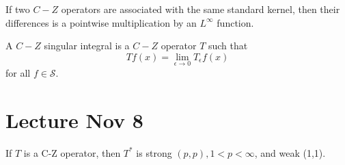 \begin{proposition}
    If two $C-Z$ operators are associated with the same standard kernel, then their differences is a pointwise multiplication by an $L^\infty$ function.
\end{proposition}

\begin{definition}
    A $C-Z$ singular integral is a $C-Z$ operator $T$ such that
    \begin{equation*}
        Tf(x)=\lim_{\epsilon\to 0}T_\epsilon f(x)
    \end{equation*}
    for all $f\in\mathcal{S}$.
\end{definition}



\section{Lecture Nov 8}
\begin{theorem}
    If $T$ is a C-Z operator, then $T^*$ is strong $(p,p), 1<p<\infty$, and weak (1,1).
\end{theorem}
